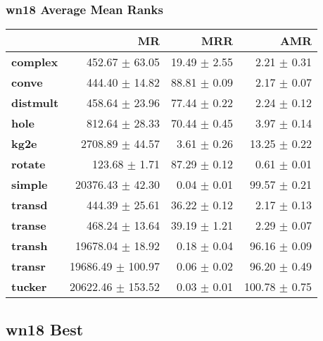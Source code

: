\documentclass{article}
\begin{document}
\subsubsection{wn18 Average Mean Ranks}
    \begin{center}
    \begin{tabular}{lrrr}
\toprule
{} &                 MR &           MRR &            AMR \\
\midrule
\textbf{complex } &     452.67 $\pm$ 63.05 &  19.49 $\pm$ 2.55 &    2.21 $\pm$ 0.31 \\
\textbf{conve   } &     444.40 $\pm$ 14.82 &  88.81 $\pm$ 0.09 &    2.17 $\pm$ 0.07 \\
\textbf{distmult} &     458.64 $\pm$ 23.96 &  77.44 $\pm$ 0.22 &    2.24 $\pm$ 0.12 \\
\textbf{hole    } &     812.64 $\pm$ 28.33 &  70.44 $\pm$ 0.45 &    3.97 $\pm$ 0.14 \\
\textbf{kg2e    } &    2708.89 $\pm$ 44.57 &   3.61 $\pm$ 0.26 &   13.25 $\pm$ 0.22 \\
\textbf{rotate  } &      123.68 $\pm$ 1.71 &  87.29 $\pm$ 0.12 &    0.61 $\pm$ 0.01 \\
\textbf{simple  } &   20376.43 $\pm$ 42.30 &   0.04 $\pm$ 0.01 &   99.57 $\pm$ 0.21 \\
\textbf{transd  } &     444.39 $\pm$ 25.61 &  36.22 $\pm$ 0.12 &    2.17 $\pm$ 0.13 \\
\textbf{transe  } &     468.24 $\pm$ 13.64 &  39.19 $\pm$ 1.21 &    2.29 $\pm$ 0.07 \\
\textbf{transh  } &   19678.04 $\pm$ 18.92 &   0.18 $\pm$ 0.04 &   96.16 $\pm$ 0.09 \\
\textbf{transr  } &  19686.49 $\pm$ 100.97 &   0.06 $\pm$ 0.02 &   96.20 $\pm$ 0.49 \\
\textbf{tucker  } &  20622.46 $\pm$ 153.52 &   0.03 $\pm$ 0.01 &  100.78 $\pm$ 0.75 \\
\bottomrule
\end{tabular}

    \end{center}
\subsection{wn18 Best}
\end{document}
